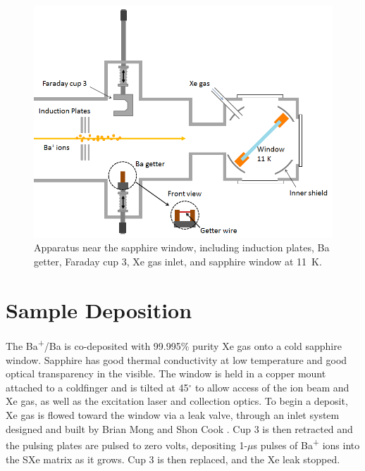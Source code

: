 
\begin{figure} %
        \centering
                \includegraphics[width=.75\textwidth]{figures/window_etc_justBa_frontViewGetter.png}
                \caption{Apparatus near the sapphire window, including induction plates, Ba getter, Faraday cup 3, Xe gas inlet, and sapphire window at 11~K.}
\label{fig:endOfBeamBa}
\end{figure}


\section{Sample Deposition}
\label{sec:deposition}

The Ba\textsuperscript{+}/Ba is co-deposited with 99.995\% purity Xe gas onto a cold sapphire window.  Sapphire has good thermal conductivity at low temperature and good optical transparency in the visible.  The window is held in a copper mount attached to a coldfinger and is tilted at 45$^{\circ}$ to allow access of the ion beam and Xe gas, as well as the excitation laser and collection optics.  To begin a deposit, Xe gas is flowed toward the window via a leak valve, through an inlet system designed and built by Brian Mong and Shon Cook \cite{Brian,Shon}.  Cup 3 is then retracted and the pulsing plates are pulsed to zero volts, depositing 1-$\mu$s pulses of Ba\textsuperscript{+} ions into the SXe matrix as it grows.  Cup 3 is then replaced, and the Xe leak stopped.

